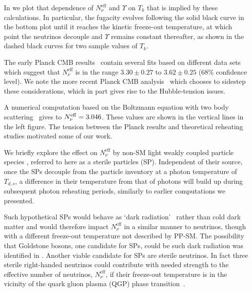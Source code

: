 In  we plot that dependence of $N^{\mathrm{eff}}_\nu$ and $\Upsilon$ on $T_k$ that is implied by these calculations. In particular, the fugacity evolves following the solid black curve in the bottom plot until it reaches the kinetic freeze-out temperature, at which point the neutrinos decouple and $\Upsilon$ remains constant thereafter, as shown in the dashed black curves for two sample values of $T_k$. 
 
The early Planck CMB results~\cite{Planck:2013pxb} contain several fits based on different data sets which suggest that $N^{\mathrm{eff}}_\nu$ is in the range $3.30\pm 0.27$ to $3.62\pm0.25$ ($68\%$ confidence level). We note the more recent Planck CMB analysis~\cite{Planck:2018vyg} which chooses to sidestep these considerations, which in part gives rise to the Hubble-tension issues.

A numerical computation based on the Boltzmann equation with two body scattering~\cite{Mangano:2005cc} gives to $N_{\nu}^{\rm eff}=3.046$. These values are shown in the vertical lines in the left figure. The tension between the Planck results and theoretical reheating studies motivated some of our work.

We  briefly explore  the effect on $N_\nu^{\text{eff}}$ by non-SM light weakly coupled particle species \cite{Birrell:2014cja}, referred to here as a sterile particles (SP). Independent of their source, once the SPs decouple from the particle inventory at a photon temperature of $T_{d,s}$, a difference in their temperature from that of photons will build up during subsequent photon reheating periods, similarly to earlier computations we presented.

Such hypothetical SPs would behave as `dark radiation'~\cite{Steigman:2013yua} rather than cold dark matter and would therefore impact $N_\nu^{\text{eff}}$ in a similar manner to neutrinos, though with a different freeze-out temperature not described by PP-SM.  The possibility that Goldstone bosons, one candidate for SPs, could be such dark radiation was identified in \cite{Weinberg:2013kea}. Another viable candidate for SPs are sterile neutrinos. In fact three sterile right-handed neutrinos could contribute with needed strength to the effective number of neutrinos, $N^{\text{eff}}_{\nu}$, if their freeze-out temperature is in the vicinity of the quark gluon plasma (QGP) phase transition~\cite{Anchordoqui:2011nh,Anchordoqui:2012qu}. 

